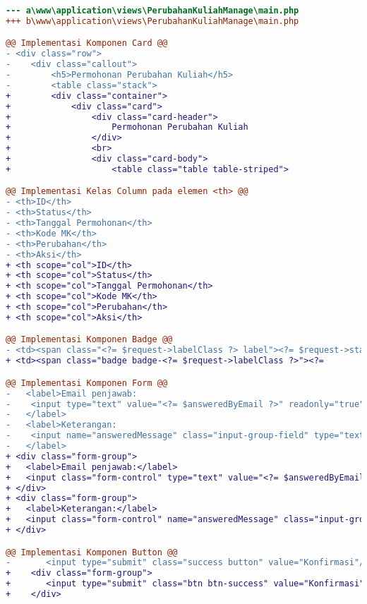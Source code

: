 \begin{lstlisting}[language=diff, caption=Perubahan file \path{\views\PerubahanKuliahManage\main.php}, label=Entri, basicstyle=\ttfamily, frame=single,
columns=fullflexible, keepspaces=true, breaklines=true]
--- a\www\application\views\PerubahanKuliahManage\main.php
+++ b\www\application\views\PerubahanKuliahManage\main.php

@@ Implementasi Komponen Card @@
- <div class="row">
-    <div class="callout">
-        <h5>Permohonan Perubahan Kuliah</h5>
-        <table class="stack">
+        <div class="container">
+            <div class="card">
+                <div class="card-header">
+                    Permohonan Perubahan Kuliah
+                </div>
+                <br>
+                <div class="card-body">
+                    <table class="table table-striped">

@@ Implementasi Kelas Column pada elemen <th> @@
- <th>ID</th>
- <th>Status</th>
- <th>Tanggal Permohonan</th>
- <th>Kode MK</th>
- <th>Perubahan</th>
- <th>Aksi</th>
+ <th scope="col">ID</th>
+ <th scope="col">Status</th>
+ <th scope="col">Tanggal Permohonan</th>
+ <th scope="col">Kode MK</th>
+ <th scope="col">Perubahan</th>
+ <th scope="col">Aksi</th>

@@ Implementasi Komponen Badge @@
- <td><span class="<?= $request->labelClass ?> label"><?= $request->status ?></span></td>
+ <td><span class="badge badge-<?= $request->labelClass ?>"><?= 

@@ Implementasi Komponen Form @@
-   <label>Email penjawab:
-    <input type="text" value="<?= $answeredByEmail ?>" readonly="true"/>
-   </label>
-   <label>Keterangan:
-    <input name="answeredMessage" class="input-group-field" type="text"/>
-   </label>
+ <div class="form-group">
+   <label>Email penjawab:</label>
+   <input class="form-control" type="text" value="<?= $answeredByEmail ?>" readonly="true"/>
+ </div>
+ <div class="form-group">
+   <label>Keterangan:</label>
+   <input class="form-control" name="answeredMessage" class="input-group-field" type="text"/>
+ </div>

@@ Implementasi Komponen Button @@                                            
-    	<input type="submit" class="success button" value="Konfirmasi"/>
+    <div class="form-group">
+       <input type="submit" class="btn btn-success" value="Konfirmasi"/>
+    </div>


\end{lstlisting}
